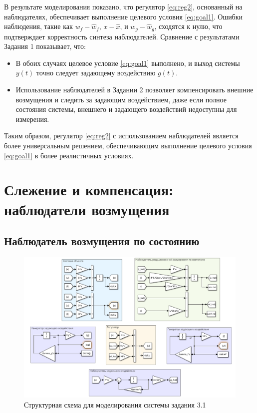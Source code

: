 В результате моделирования показано, что регулятор \eqref{eq:reg2}, 
основанный на наблюдателях, обеспечивает выполнение целевого условия 
\eqref{eq:goal1}. Ошибки наблюдения, такие как $w_f-\hat w_f$, $x-\hat x$, и $w_g-\hat w_g$, 
сходятся к нулю, что подтверждает корректность синтеза наблюдателей.
Сравнение с результатами Задания 1 показывает, что:
\begin{itemize}
    \item В обоих случаях целевое условие \eqref{eq:goal1} выполнено, и 
    выход системы $y(t)$ точно следует задающему воздействию $g(t)$.
    \item Использование наблюдателей в Задании 2 позволяет компенсировать 
    внешние возмущения и следить за задающим воздействием, даже если полное 
    состояния системы, внешнего и задающего воздействий недоступны для измерения.
\end{itemize}
Таким образом, регулятор \eqref{eq:reg2} с использованием наблюдателей 
является более универсальным решением, обеспечивающим выполнение целевого
условия \eqref{eq:goal1} в более реалистичных условиях.





\section{Слежение и компенсация: наблюдатели возмущения}

\subsection{Наблюдатель возмущения по состоянию}

\begin{figure}[H]
    \centering
    \includegraphics[width=\linewidth]{figs/31slx.png}
    \caption{Структурная схема для моделирования системы задания 3.1}
    \label{fig:30}
\end{figure}

